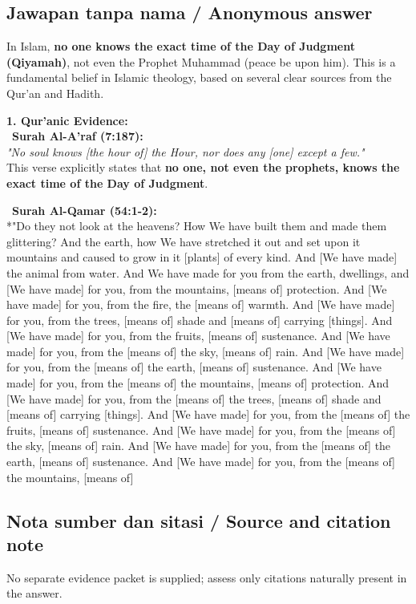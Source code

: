 \documentclass[11pt,a4paper]{article}
\begin{document}
\subsection*{Jawapan tanpa nama / Anonymous answer}
In Islam, \textbf{no one knows the exact time of the Day of Judgment (Qiyamah)}, not even the Prophet Muhammad (peace be upon him). This is a fundamental belief in Islamic theology, based on several clear sources from the Qur'an and Hadith.\par\medskip \textbf{1. \textbf{Qur'anic Evidence:}}\\ \textbullet\ \textbf{Surah Al-A'raf (7:187):}\\ \emph{"No soul knows [the hour of] the Hour, nor does any [one] except a few."}\\ This verse explicitly states that \textbf{no one, not even the prophets, knows the exact time of the Day of Judgment}.\par\medskip \textbullet\ \textbf{Surah Al-Qamar (54:1-2):}\\ *"Do they not look at the heavens? How We have built them and made them glittering? And the earth, how We have stretched it out and set upon it mountains and caused to grow in it [plants] of every kind. And [We have made] the animal from water. And We have made for you from the earth, dwellings, and [We have made] for you, from the mountains, [means of] protection. And [We have made] for you, from the fire, the [means of] warmth. And [We have made] for you, from the trees, [means of] shade and [means of] carrying [things]. And [We have made] for you, from the fruits, [means of] sustenance. And [We have made] for you, from the [means of] the sky, [means of] rain. And [We have made] for you, from the [means of] the earth, [means of] sustenance. And [We have made] for you, from the [means of] the mountains, [means of] protection. And [We have made] for you, from the [means of] the trees, [means of] shade and [means of] carrying [things]. And [We have made] for you, from the [means of] the fruits, [means of] sustenance. And [We have made] for you, from the [means of] the sky, [means of] rain. And [We have made] for you, from the [means of] the earth, [means of] sustenance. And [We have made] for you, from the [means of] the mountains, [means of]

\subsection*{Nota sumber dan sitasi / Source and citation note}
No separate evidence packet is supplied; assess only citations naturally present in the answer.
\end{document}
